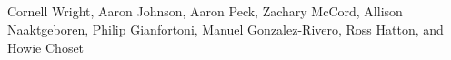 \begin{resume}
\section{}

Cornell Wright, Aaron Johnson, Aaron Peck, Zachary McCord, Allison Naaktgeboren, Philip Gianfortoni, Manuel Gonzalez-Rivero, Ross Hatton, and Howie Choset


\end{resume}

